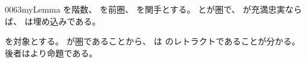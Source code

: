 \documentclass[index]{subfiles}
\begin{document}
\begin{myBlock}{0063}{myLemma}
  を階数、
  を前圏、
  を関手とする。
  とが圏で、
  が充満忠実ならば、
  は埋め込みである。
\end{myBlock}
\begin{myProof}
  を対象とする。
  が圏であることから、
  は
  のレトラクトであることが分かる。
  後者はより命題である。
\end{myProof}
\end{document}
